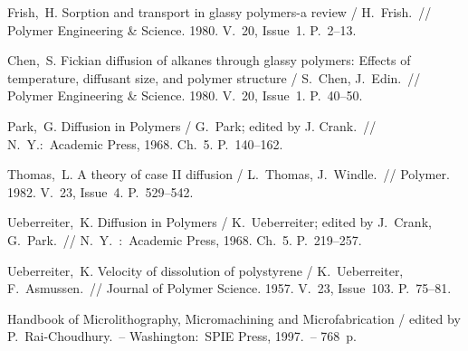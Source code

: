 \begin{thebibliography}{99}
 Frish,~H. Sorption and transport in glassy polymers-a review /
H.~Frish.~// Polymer Engineering \& Science. 1980. V.~20, Issue~1. P.~2--13.

 Chen,~S. Fickian diffusion of alkanes through glassy polymers:
Effects of temperature, diffusant size, and polymer structure / S.~Chen,
J.~Edin.~// Polymer Engineering \& Science. 1980. V.~20, Issue~1. P.~40--50.

 Park,~G. Diffusion in Polymers / G.~Park; edited by J. Crank.~//
N.~Y.:~Academic Press, 1968. Ch.~5. P.~140--162.

 Thomas,~L. A theory of case II diffusion / L.~Thomas,
J.~Windle.~// Polymer. 1982. V.~23, Issue~4. P.~529--542.

 Ueberreiter,~K. Diffusion in Polymers / K.~Ueberreiter; edited by
J.~Crank, G.~Park.~// N.~Y.~:~Academic Press, 1968. Ch.~5. P.~219--257.

 Ueberreiter,~K. Velocity of dissolution of polystyrene /
K.~Ueberreiter, F.~Asmussen.~// Journal of Polymer Science. 1957. V.~23,
Issue~103. P.~75--81.

 Handbook of Microlithography, Micromachining and Microfabrication
/ edited by P.~Rai-Choudhury.~-- Washington:~SPIE Press, 1997.~-- 768~p.

\end{thebibliography}
